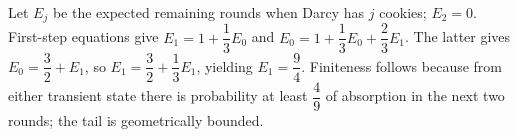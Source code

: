 Let $E_j$ be the expected remaining rounds when Darcy has $j$ cookies; $E_2=0$. First-step equations give $E_1=1+\dfrac{1}{3}E_0$ and $E_0=1+\dfrac{1}{3}E_0+\dfrac{2}{3}E_1$. The latter gives $E_0=\dfrac{3}{2}+E_1$, so $E_1=\dfrac{3}{2}+\dfrac{1}{3}E_1$, yielding $\boxed{E_1=\dfrac{9}{4}}$. Finiteness follows because from either transient state there is probability at least $\dfrac{4}{9}$ of absorption in the next two rounds; the tail is geometrically bounded.
